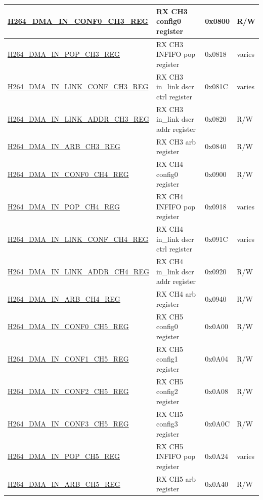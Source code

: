 \begin{longtable}{ | p{7.5cm} | p{5.7cm} | p{1.2cm} | p{1.5cm} | }
\hyperref[regdesc:H264DMAINCONF0CH3REG]{H264\_DMA\_IN\_CONF0\_CH3\_REG} & RX CH3 config0 register & 0x0800 & R/W \\ \hline
\hyperref[regdesc:H264DMAINPOPCH3REG]{H264\_DMA\_IN\_POP\_CH3\_REG} & RX CH3 INFIFO pop register & 0x0818 & varies \\ \hline
\hyperref[regdesc:H264DMAINLINKCONFCH3REG]{H264\_DMA\_IN\_LINK\_CONF\_CH3\_REG} & RX CH3 in\_link dscr ctrl register & 0x081C & varies \\ \hline
\hyperref[regdesc:H264DMAINLINKADDRCH3REG]{H264\_DMA\_IN\_LINK\_ADDR\_CH3\_REG} & RX CH3 in\_link dscr addr register & 0x0820 & R/W \\ \hline
\hyperref[regdesc:H264DMAINARBCH3REG]{H264\_DMA\_IN\_ARB\_CH3\_REG} & RX CH3 arb register & 0x0840 & R/W \\ \hline

\hyperref[regdesc:H264DMAINCONF0CH4REG]{H264\_DMA\_IN\_CONF0\_CH4\_REG} & RX CH4 config0 register & 0x0900 & R/W \\ \hline
\hyperref[regdesc:H264DMAINPOPCH4REG]{H264\_DMA\_IN\_POP\_CH4\_REG} & RX CH4 INFIFO pop register & 0x0918 & varies \\ \hline
\hyperref[regdesc:H264DMAINLINKCONFCH4REG]{H264\_DMA\_IN\_LINK\_CONF\_CH4\_REG} & RX CH4 in\_link dscr ctrl register & 0x091C & varies \\ \hline
\hyperref[regdesc:H264DMAINLINKADDRCH4REG]{H264\_DMA\_IN\_LINK\_ADDR\_CH4\_REG} & RX CH4 in\_link dscr addr register & 0x0920 & R/W \\ \hline
\hyperref[regdesc:H264DMAINARBCH4REG]{H264\_DMA\_IN\_ARB\_CH4\_REG} & RX CH4 arb register & 0x0940 & R/W \\ \hline

\hyperref[regdesc:H264DMAINCONF0CH5REG]{H264\_DMA\_IN\_CONF0\_CH5\_REG} & RX CH5 config0 register & 0x0A00 & R/W \\ \hline
\hyperref[regdesc:H264DMAINCONF1CH5REG]{H264\_DMA\_IN\_CONF1\_CH5\_REG} & RX CH5 config1 register & 0x0A04 & R/W \\ \hline
\hyperref[regdesc:H264DMAINCONF2CH5REG]{H264\_DMA\_IN\_CONF2\_CH5\_REG} & RX CH5 config2 register & 0x0A08 & R/W \\ \hline
\hyperref[regdesc:H264DMAINCONF3CH5REG]{H264\_DMA\_IN\_CONF3\_CH5\_REG} & RX CH5 config3 register & 0x0A0C & R/W \\ \hline
\hyperref[regdesc:H264DMAINPOPCH5REG]{H264\_DMA\_IN\_POP\_CH5\_REG} & RX CH5 INFIFO pop register & 0x0A24 & varies \\ \hline
\hyperref[regdesc:H264DMAINARBCH5REG]{H264\_DMA\_IN\_ARB\_CH5\_REG} & RX CH5 arb register & 0x0A40 & R/W \\ \hline


\end{longtable}
